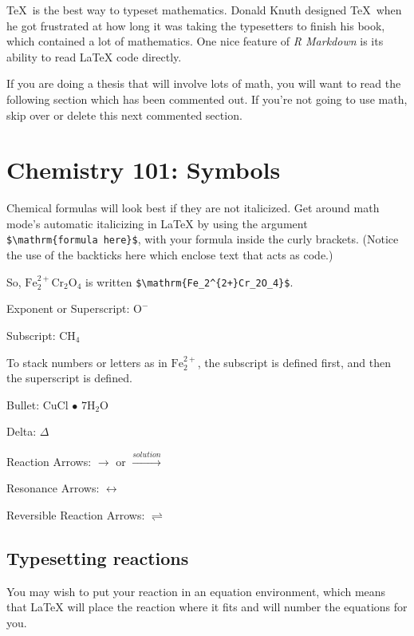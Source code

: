 \documentclass[12pt,twoside]{book}
\begin{document}
\TeX~is the best way to typeset mathematics. Donald Knuth designed \TeX~when he got frustrated at how long it was taking the typesetters to finish his book, which contained a lot of mathematics. One nice feature of \emph{R Markdown} is its ability to read LaTeX code directly.

If you are doing a thesis that will involve lots of math, you will want to read the following section which has been commented out. If you're not going to use math, skip over or delete this next commented section.

\section{Chemistry 101: Symbols}\label{chemistry-101-symbols}

Chemical formulas will look best if they are not italicized. Get around math mode's automatic italicizing in LaTeX by using the argument \texttt{\$\textbackslash{}mathrm\{formula\ here\}\$}, with your formula inside the curly brackets. (Notice the use of the backticks here which enclose text that acts as code.)

So, \(\mathrm{Fe_2^{2+}Cr_2O_4}\) is written \texttt{\$\textbackslash{}mathrm\{Fe\_2\^{}\{2+\}Cr\_2O\_4\}\$}.

\noindent Exponent or Superscript: \(\mathrm{O^-}\)

\noindent Subscript: \(\mathrm{CH_4}\)

To stack numbers or letters as in \(\mathrm{Fe_2^{2+}}\), the subscript is defined first, and then the superscript is defined.

\noindent Bullet: CuCl \(\bullet\) \(\mathrm{7H_{2}O}\)

\noindent Delta: \(\Delta\)

\noindent Reaction Arrows: \(\longrightarrow\) or \(\xrightarrow{solution}\)

\noindent Resonance Arrows: \(\leftrightarrow\)

\noindent Reversible Reaction Arrows: \(\rightleftharpoons\)

\subsection{Typesetting reactions}\label{typesetting-reactions}

You may wish to put your reaction in an equation environment, which means that LaTeX will place the reaction where it fits and will number the equations for you.
\end{document}
